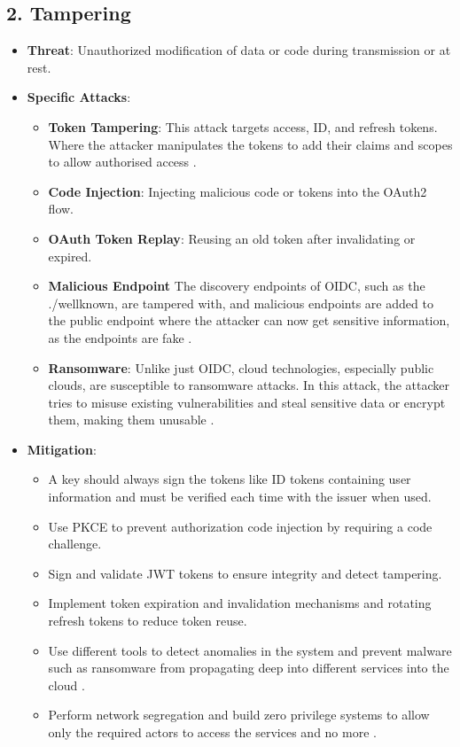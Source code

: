 \subsection*{2. Tampering}
\begin{itemize}
    \item \textbf{Threat}: Unauthorized modification of data or code during transmission or at rest.
    \item \textbf{Specific Attacks}:
    \begin{itemize}
        \item \textbf{Token Tampering}: This attack targets access, ID, and refresh tokens. Where the attacker manipulates the tokens to add their claims and scopes to allow authorised access \citep{oidc_attacks}.
        \item \textbf{Code Injection}: Injecting malicious code or tokens into the OAuth2 flow.
        \item \textbf{OAuth Token Replay}: Reusing an old token after invalidating or expired.
        \item \textbf{Malicious Endpoint} The discovery endpoints of OIDC, such as the ./wellknown, are tampered with, and malicious endpoints are added to the public endpoint where the attacker can now get sensitive information, as the endpoints are fake \citep{oidc_attacks}.
        \item \textbf{Ransomware}: Unlike just OIDC, cloud technologies, especially public clouds, are susceptible to ransomware attacks. In this attack, the attacker tries to misuse existing vulnerabilities and steal sensitive data or encrypt them, making them unusable \citep{ransomeware}.
    \end{itemize}
    \item \textbf{Mitigation}:
    \begin{itemize}
         \item A key should always sign the tokens like ID tokens containing user information and must be verified each time with the issuer when used.
        \item Use PKCE to prevent authorization code injection by requiring a code challenge.
        \item Sign and validate JWT tokens to ensure integrity and detect tampering.
        \item Implement token expiration and invalidation mechanisms and rotating refresh tokens to reduce token reuse.
        \item Use different tools to detect anomalies in the system and prevent malware such as ransomware from propagating deep into different services into the cloud \citep{ransomeware}.
        \item Perform network segregation and build zero privilege systems to allow only the required actors to access the services and no more \citep{zero_trust}. 
    \end{itemize}
\end{itemize}

